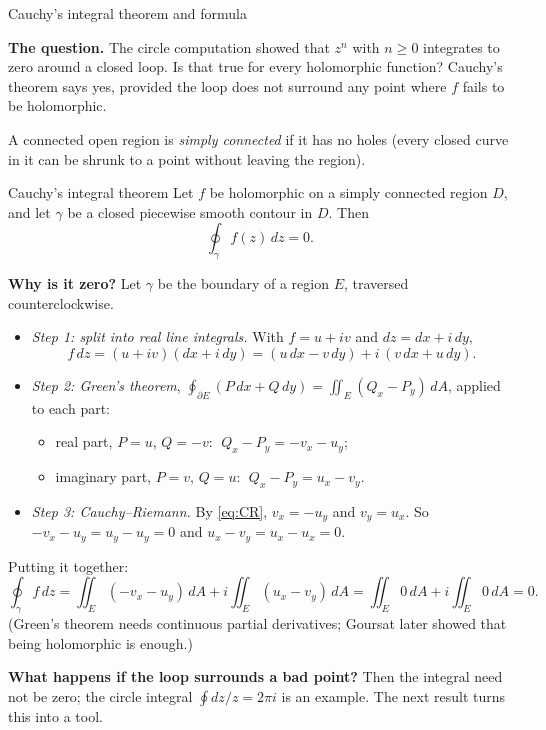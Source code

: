 \documentclass[11pt]{beamer}
\begin{document}
\begin{frame}[allowframebreaks=1.00]{Cauchy's integral theorem and formula}
\footnotesize

\textbf{The question.} The circle computation showed that \(z^n\) with \(n\ge0\) integrates to zero
around a closed loop. Is that true for every holomorphic function? Cauchy's theorem says yes,
provided the loop does not surround any point where \(f\) fails to be holomorphic.

A connected open region is \emph{simply connected} if it has no holes (every closed curve in it
can be shrunk to a point without leaving the region).

\begin{block}{Cauchy's integral theorem}
Let $f$ be holomorphic on a simply connected region $D$, and let $\gamma$ be a
closed piecewise smooth contour in $D$.  Then
\[
  \oint_\gamma f(z)\,dz=0.
\]
\end{block}
\par\framebreak\par
\textbf{Why is it zero?} Let \(\gamma\) be the boundary of a region \(E\), traversed counterclockwise.
\begin{itemize}
  \item \emph{Step 1: split into real line integrals.} With \(f=u+iv\) and \(dz=dx+i\,dy\),
        \[
          f\,dz=(u+iv)(dx+i\,dy)=(u\,dx-v\,dy)+i\,(v\,dx+u\,dy).
        \]
  \item \emph{Step 2: Green's theorem}, \(\oint_{\partial E}(P\,dx+Q\,dy)=\iint_E(Q_x-P_y)\,dA\), applied
        to each part:
        \begin{itemize}
          \item real part, \(P=u\), \(Q=-v\): \(\;Q_x-P_y=-v_x-u_y\);
          \item imaginary part, \(P=v\), \(Q=u\): \(\;Q_x-P_y=u_x-v_y\).
        \end{itemize}
  \item \emph{Step 3: Cauchy--Riemann.} By \eqref{eq:CR}, \(v_x=-u_y\) and \(v_y=u_x\). So
        \(-v_x-u_y=u_y-u_y=0\) and \(u_x-v_y=u_x-u_x=0\).
\end{itemize}
Putting it together:
\[
 \oint_\gamma f\,dz
 =\iint_E(-v_x-u_y)\,dA+i\iint_E(u_x-v_y)\,dA
 =\iint_E0\,dA+i\iint_E0\,dA=0.
\]
(Green's theorem needs continuous partial derivatives; Goursat later showed that being
holomorphic is enough.)
\par\framebreak\par
\textbf{What happens if the loop surrounds a bad point?} Then the integral need not be zero; the
circle integral \(\oint dz/z=2\pi i\) is an example. The next result turns this into a tool.


\end{frame}
\end{document}
